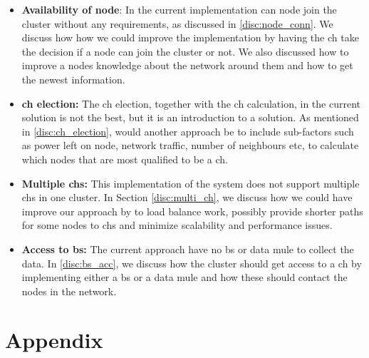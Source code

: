 \documentclass[USenglish]{uit-thesis}
\begin{document}
\begin{itemize}
\item \textbf{Availability of node}: In the current implementation can node join the cluster without any requirements, as discussed in \autoref{disc:node_conn}. We discuss how  how we could improve the implementation by having the \gls{ch} take the decision if a node can join the cluster or not. We also discussed how to improve a nodes knowledge about the network around them and how to get the newest information.

\item \textbf{\gls{ch} election:} The \gls{ch} election, together with the \gls{ch} calculation, in the current solution is not the best, but it is an introduction to a solution. As mentioned in \autoref{disc:ch_election}, would another approach be to include sub-factors such as power left on node, network traffic, number of neighbours etc, to calculate which nodes that are most qualified to be a \gls{ch}. 

\item \textbf{Multiple \glspl{ch}:} This implementation of the system does not support multiple \glspl{ch} in one cluster. In Section \autoref{disc:multi_ch}, we discuss how we could have improve our approach by to load balance work, possibly provide shorter paths for some nodes to \glspl{ch} and minimize scalability and performance issues.

\item \textbf{Access to \gls{bs}:} The current approach have no \gls{bs} or data mule to collect the data. In \autoref{disc:bs_acc}, we discuss how the cluster should get access to a \gls{ch} by implementing either a \gls{bs} or a data mule and how these should contact the nodes in the network.

\end{itemize}



\chapter{Appendix}



\backmatter


\newpage{}
\end{document}

